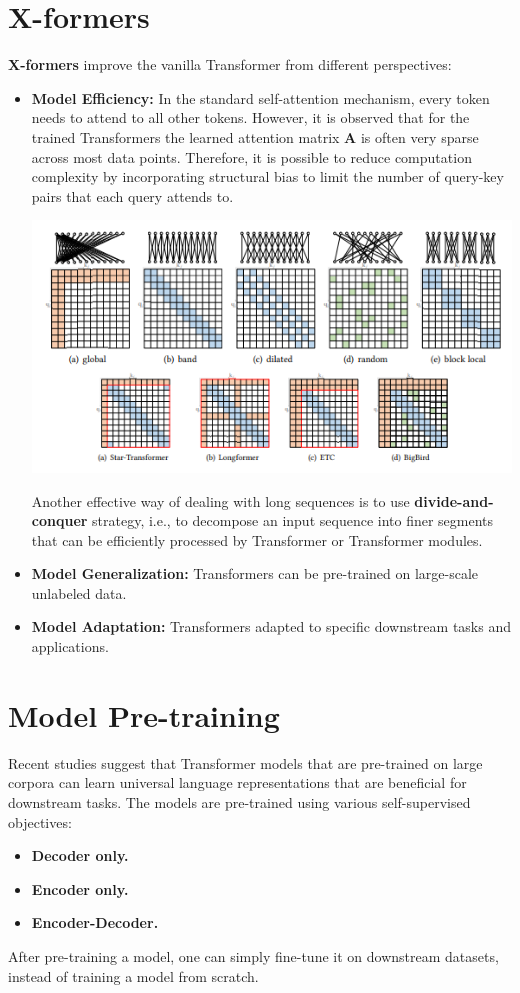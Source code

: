 \section{X-formers}
\textbf{X-formers} improve the vanilla Transformer from different perspectives:
\begin{itemize}
    \item \textbf{Model Efficiency:} In the standard self-attention mechanism, every token needs to attend to all other tokens. However, it is observed that for the trained Transformers the learned attention matrix $\textbf{A}$ is often very sparse across most data points.  Therefore, it is possible to reduce computation complexity by incorporating structural bias to limit the number of query-key pairs that each query attends to.
    \begin{center}
        \includegraphics[]{images/x-formrs.png}
    \end{center}
    Another effective way of dealing with long sequences is to use \textbf{divide-and-conquer} strategy, i.e., to decompose an input sequence into finer segments that can be efficiently processed by Transformer or Transformer modules.

    \item \textbf{Model Generalization:} Transformers can be pre-trained on large-scale unlabeled data.

    \item \textbf{Model Adaptation:} Transformers adapted to specific downstream tasks and applications.

\end{itemize}

\section{Model Pre-training}
Recent studies suggest that Transformer models that are pre-trained on large corpora can learn universal language representations that are beneficial for downstream tasks. The models are pre-trained using various self-supervised objectives:
\begin{itemize}
    \item  \textbf{Decoder only.}
    
    \item \textbf{Encoder only.}

    \item \textbf{Encoder-Decoder.}
\end{itemize}
After pre-training a model, one can simply fine-tune it on downstream datasets, instead of training a model from scratch.

